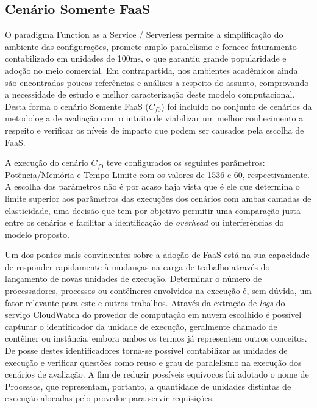 \documentclass[english,brazilian]{UNISINOSmonografia} %
\begin{document}






\subsection{Cenário Somente FaaS}
\label{sec:resultados-modelo-faas}



O paradigma Function as a Service / Serverless permite a simplificação do ambiente das configurações, promete amplo paralelismo e fornece faturamento contabilizado em unidades de 100ms, o que garantiu grande popularidade e adoção no meio comercial.
%
Em contrapartida, nos ambientes acadêmicos ainda são encontradas poucas referências e análises a respeito do assunto, comprovando a necessidade de estudo e melhor caracterização deste modelo computacional.
%
Desta forma o cenário Somente FaaS ($C_{f0}$) foi incluído no conjunto de cenários da metodologia de avaliação com o intuito de viabilizar um melhor conhecimento a respeito e verificar os níveis de impacto que podem ser causados pela escolha de FaaS.



A execução do cenário $C_{f0}$ teve configurados os seguintes parâmetros: Potência/Memória e Tempo Limite com os valores de 1536 e 60, respectivamente.
%
A escolha dos parâmetros não é por acaso haja vista que é ele que determina o limite superior aos parâmetros das execuções dos cenários com ambas camadas de elasticidade, uma decisão que tem por objetivo permitir uma comparação justa entre os cenários e facilitar a identificação de \textit{overhead} ou interferências do modelo proposto.



Um dos pontos mais convincentes sobre a adoção de FaaS está na sua capacidade de responder rapidamente à mudanças na carga de trabalho através do lançamento de novas unidades de execução.
%
Determinar o número de processadores, processos ou contêineres envolvidos na execução é, sem dúvida, um fator relevante para este e outros trabalhos.
%
Através da extração de \textit{logs} do serviço CloudWatch do provedor de computação em nuvem escolhido é possível capturar o identificador da unidade de execução, geralmente chamado de contêiner ou instância, embora ambos os termos já representem outros conceitos.
%
De posse destes identificadores torna-se possível contabilizar as unidades de execução e verificar questões como reuso e grau de paralelismo na execução dos cenários de avaliação.
%
A fim de reduzir possíveis equívocos foi adotado o nome de Processos, que representam, portanto, a quantidade de unidades distintas de execução alocadas pelo provedor para servir requisições.
\end{document}
